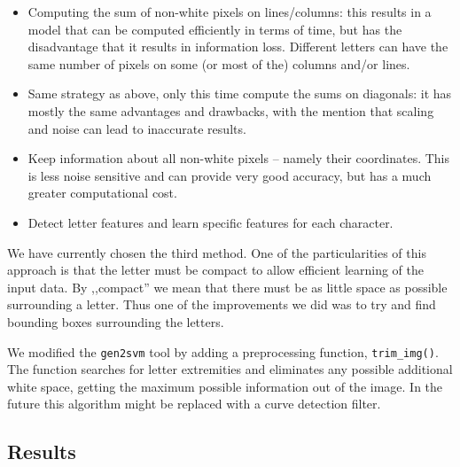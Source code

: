 \documentclass[a4paper,12pt]{article}
\begin{document}
\begin{itemize}
	\item Computing the sum of non-white pixels on lines/columns: this results
	in a model that can be computed efficiently in terms of time, but has the
	disadvantage that it results in information loss. Different letters can
	have the same number of pixels on some (or most of the) columns and/or
	lines.
	\item Same strategy as above, only this time compute the sums on diagonals:
	it has mostly the same advantages and drawbacks, with the mention that
	scaling and noise can lead to inaccurate results.
	\item Keep information about all non-white pixels -- namely their
	coordinates. This is less noise sensitive and can provide very good
	accuracy, but has a much greater computational cost.
	\item Detect letter features and learn specific features for each character.
\end{itemize}

We have currently chosen the third method. One of the particularities of this
approach is that the letter must be compact to allow efficient learning of the
input data. By ,,compact'' we mean that there must be as little space as
possible surrounding a letter. Thus one of the improvements we did was to try
and find bounding boxes surrounding the letters.

We modified the \texttt{gen2svm} tool by adding a preprocessing function,
\texttt{trim\_img()}. The function searches for letter extremities and
eliminates any possible additional white space, getting the maximum possible
information out of the image. In the future this algorithm might be replaced
with a curve detection filter.

\subsection*{Results}
\end{document}
